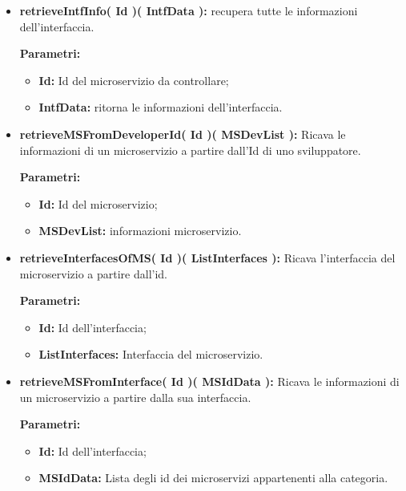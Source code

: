 \begin{itemize}
\begin{itemize}
			\item \textbf{retrieveIntfInfo( Id )( IntfData ):} recupera tutte le informazioni dell'interfaccia. 
			\begin{description}
				\item[\textbf{Parametri:}]
			\end{description}
			\begin{itemize}
				\item \textbf{Id:} Id del microservizio da controllare;
				\item \textbf{IntfData:} ritorna le informazioni dell'interfaccia.
			\end{itemize}
				
			\item \textbf{retrieveMSFromDeveloperId( Id )( MSDevList ):} Ricava le informazioni di un microservizio a partire dall'Id di uno sviluppatore.
				\begin{description}
    				\item[\textbf{Parametri:}]
				\end{description}
				\begin{itemize}
					\item \textbf{Id:} Id del microservizio;
					\item \textbf{MSDevList:} informazioni microservizio.
				\end{itemize}
				
			\item \textbf{retrieveInterfacesOfMS( Id )( ListInterfaces ):} Ricava l'interfaccia del microservizio a partire dall'id.
				\begin{description}
    				\item[\textbf{Parametri:}]
				\end{description}
				\begin{itemize}
					\item \textbf{Id:} Id dell'interfaccia;
					\item \textbf{ListInterfaces:} Interfaccia del microservizio.
				\end{itemize}
				
			\item \textbf{retrieveMSFromInterface( Id )( MSIdData ):} Ricava le informazioni di un microservizio a partire dalla sua interfaccia.
				\begin{description}
    				\item[\textbf{Parametri:}]
				\end{description}
				\begin{itemize}
					\item \textbf{Id:} Id dell'interfaccia;
					\item \textbf{MSIdData:} Lista degli id dei microservizi appartenenti alla categoria.
				\end{itemize}
			

\end{itemize}
\end{itemize}
